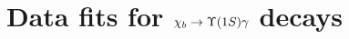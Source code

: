 \chapter{Data fits for \texorpdfstring{$\chib \to \Y1S \gamma$}{chib --> Y(1S) gamma} decays}
\label{sec:chib:ups1s:fits}

